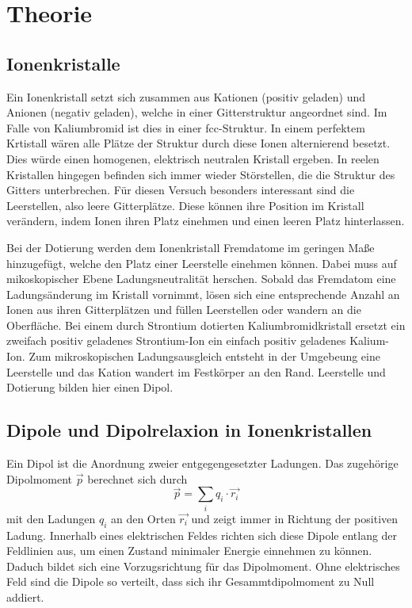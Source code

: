 \section{Theorie}
\label{sec:Theorie}



\subsection{Ionenkristalle}
Ein Ionenkristall setzt sich zusammen aus Kationen (positiv geladen) und Anionen (negativ geladen),
welche in einer Gitterstruktur angeordnet sind. Im Falle von Kaliumbromid ist dies in einer fcc-Struktur.
In einem perfektem Krtistall wären alle Plätze der Struktur durch diese Ionen alternierend besetzt.
Dies würde einen homogenen, elektrisch neutralen Kristall ergeben.
In reelen Kristallen hingegen befinden sich immer wieder Störstellen,
die die Struktur des Gitters unterbrechen.
Für diesen Versuch besonders interessant sind die Leerstellen,
also leere Gitterplätze.
Diese können ihre Position im Kristall verändern,
indem Ionen ihren Platz einehmen und einen leeren Platz hinterlassen.

Bei der Dotierung werden dem Ionenkristall Fremdatome im geringen Maße hinzugefügt,
welche den Platz einer Leerstelle einehmen können.
Dabei muss auf mikoskopischer Ebene Ladungsneutralität herschen.
Sobald das Fremdatom eine Ladungsänderung im Kristall vornimmt,
lösen sich eine entsprechende Anzahl an Ionen aus ihren Gitterplätzen und füllen Leerstellen
oder wandern an die Oberfläche.
Bei einem durch Strontium dotierten Kaliumbromidkristall
ersetzt ein zweifach positiv geladenes Strontium-Ion ein einfach positiv geladenes Kalium-Ion.
Zum mikroskopischen Ladungsausgleich entsteht in der Umgebeung eine Leerstelle 
und das Kation wandert im Festkörper an den Rand.
Leerstelle und Dotierung bilden hier einen Dipol.



\subsection{Dipole und Dipolrelaxion in Ionenkristallen}
Ein Dipol ist die Anordnung zweier entgegengesetzter Ladungen.
Das zugehörige Dipolmoment $\vec{p}$ berechnet sich durch
\begin{equation*}
    \vec{p} = \sum_i q_i \cdot \vec{r_i}
\end{equation*}
mit den Ladungen $q_i$ an den Orten $\vec{r_i}$ 
und zeigt immer in Richtung der positiven Ladung.
Innerhalb eines elektrischen Feldes richten sich diese Dipole entlang der Feldlinien aus,
um einen Zustand minimaler Energie einnehmen zu können.
Daduch bildet sich eine Vorzugsrichtung für das Dipolmoment.
Ohne elektrisches Feld sind die Dipole so verteilt, 
dass sich ihr Gesammtdipolmoment zu Null addiert.

